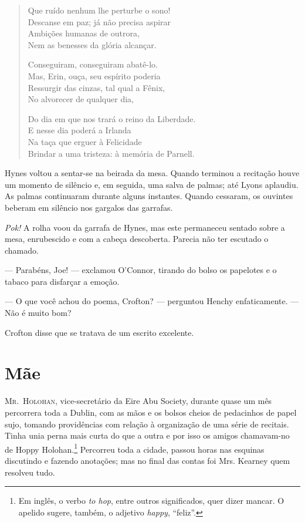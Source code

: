 {\begin{verse}
Que ruído nenhum lhe perturbe o sono!\\
Descanse em paz; já não precisa aspirar\\
Ambições humanas de outrora,\\
Nem as benesses da glória alcançar.

Conseguiram, conseguiram abatê-lo.\\
Mas, Erin, ouça, seu espírito poderia\\
Ressurgir das cinzas, tal qual a Fênix,\\
No alvorecer de qualquer dia,

Do dia em que nos trará o reino da Liberdade.\\
E nesse dia poderá a Irlanda\\
Na taça que erguer à Felicidade\\
Brindar a uma tristeza: à memória de Parnell.
\end{verse}\par}

Hynes voltou a sentar-se na beirada da mesa. Quando terminou a
recitação houve um momento de silêncio e, em seguida, uma salva de
palmas; até Lyons aplaudiu. As palmas continuaram durante alguns
instantes. Quando cessaram, os ouvintes beberam em silêncio nos
gargalos das garrafas.

\textit{Pok!} A rolha voou da garrafa de Hynes, mas este permaneceu sentado
sobre a mesa, enrubescido e com a cabeça descoberta. Parecia não ter
escutado o chamado.

--- Parabéns, Joe! --- exclamou O'Connor, tirando do bolso os
papelotes e o tabaco para disfarçar a emoção.

--- O que você achou do poema, Crofton? --- perguntou Henchy
enfaticamente. --- Não é muito bom?

Crofton disse que se tratava de um escrito excelente.

\chapter{Mãe}

\textsc{Mr.~Holohan,} vice-secretário da Eire Abu Society, durante quase um mês
percorrera toda a Dublin, com as mãos e os bolsos cheios de pedacinhos
de papel sujo, tomando providências com relação à organização de uma
série de recitais. Tinha unia perna mais curta do que a outra e por
isso os amigos chamavam-no de Hoppy Holohan.\footnote{ Em inglês, o
verbo \textit{to hop}, entre outros significados, quer dizer
mancar. O apelido sugere, também, o adjetivo \textit{happy},
``feliz''.} Percorreu toda a cidade, passou horas nas
esquinas discutindo e fazendo anotações; mas no final das contas foi
Mrs.  Kearney quem resolveu tudo.

